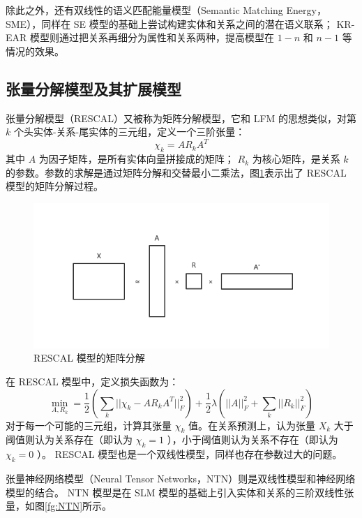 \documentclass{llncs}
\begin{document}
除此之外，还有双线性的语义匹配能量模型（Semantic Matching Energy，SME）\cite{DBLP:journals/jmlr/BordesGWB12}，同样在 SE 模型的基础上尝试构建实体和关系之间的潜在语义联系； KR-EAR 模型\cite{DBLP:conf/ijcai/LinLS16}则通过把关系再细分为属性和关系两种，提高模型在 $1-n$ 和 $n-1$ 等情况的效果。

\subsection{张量分解\cite{harshman1994parafac}模型及其扩展模型}

张量分解模型（RESCAL）\cite{DBLP:conf/icml/NickelTK11,DBLP:conf/www/NickelTK12}又被称为矩阵分解模型，它和 LFM 的思想类似，对第 $k$ 个头实体-关系-尾实体的三元组，定义一个三阶张量：
\begin{displaymath}
\chi_k=AR_kA^T
\end{displaymath}
其中 $A$ 为因子矩阵，是所有实体向量拼接成的矩阵； $R_k$ 为核心矩阵，是关系 $k$ 的参数。参数的求解是通过矩阵分解和交替最小二乘法，图\ref{fg:RESCAL}表示出了 RESCAL 模型的矩阵分解过程。

\begin{figure}
	\centering
	\includegraphics[width=0.8\columnwidth]{figures/RESCAL.png}
	\caption{ RESCAL 模型的矩阵分解}
	\label{fg:RESCAL}
\end{figure}

在 RESCAL 模型中，定义损失函数为：
\begin{displaymath}
\min_{A,R_k}=\frac{1}{2}(\sum_k||\chi_k-AR_kA^T||^2_F)+\frac{1}{2}\lambda(||A||^2_F+\sum_k||R_k||^2_F)
\end{displaymath}
对于每一个可能的三元组，计算其张量 $\chi_k$ 值。在关系预测上，认为张量 $X_k$ 大于阈值则认为关系存在（即认为 $\chi_k=1$ ），小于阈值则认为关系不存在（即认为 $\chi_k=0$ ）。 RESCAL 模型也是一个双线性模型，同样也存在参数过大的问题。

张量神经网络模型（Neural Tensor Networks，NTN）\cite{DBLP:conf/nips/SocherCMN13}则是双线性模型和神经网络模型的结合。 NTN 模型是在 SLM 模型的基础上引入实体和关系的三阶双线性张量，如图\ref{fg:NTN}所示。
\end{document}
